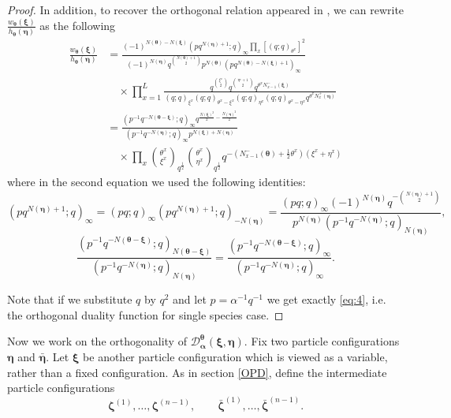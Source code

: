 \documentclass{ximera}
\begin{document}
\begin{proof}
In addition, to recover the orthogonal relation appeared in \cite{CFG21}, we can rewrite $\frac{w_{\boldsymbol\theta}(\boldsymbol\xi)}{h_{\boldsymbol\theta}(\boldsymbol\eta)}$ as the following
\begin{equation*}
\begin{array}{cl}
   \frac{w_{\boldsymbol\theta}(\boldsymbol\xi)}{h_{\boldsymbol\theta}(\boldsymbol\eta)}  & =\frac{(-1)^{N(\boldsymbol\theta)-N(\boldsymbol\xi)}\left(pq^{N(\boldsymbol\eta)+1};q\right)_\infty\prod_x[(q;q)_{\theta^x}]^{2}}{(-1)^{N(\boldsymbol\eta)}q^{\binom{N(\boldsymbol\theta)+1}{2}}p^{N(\boldsymbol\theta)}\left(pq^{N(\boldsymbol\theta) -N(\boldsymbol\xi)+1}\right)_\infty } \\ & \quad\times
   \displaystyle\prod_{x=1}^L\frac{q^{\binom{\xi^x}{2}}q^{\binom{\eta^x+1}{2}}q^{\theta^x N_{x-1}^-(\boldsymbol\xi)}}{(q;q)_{\xi^x}(q;q)_{\theta^x-\xi^x}(q;q)_{\eta^x}(q;q)_{\theta^x-\eta^x}q^{\theta^x N_{x}^+(\boldsymbol\eta)}}\\ 
     &  =\frac{(p^{-1}q^{-N(\boldsymbol\theta-\boldsymbol\xi)};q)_\infty q^{\frac{N(\boldsymbol\xi)^2}{2}-\frac{N(\boldsymbol\eta)^2}{2}}}{(p^{-1}q^{-N(\boldsymbol\eta)};q)_\infty p^{N(\boldsymbol\xi)+N(\boldsymbol\eta)}}
     \\ & \quad\times\displaystyle{\prod_{x}}\binom{\theta^x}{\xi^x}_{q^{\frac{1}{2}}}\binom{\theta^x}{\eta^x}_{q^{\frac{1}{2}}}q^{-\left(N_{x-1}^-(\boldsymbol\theta)+\frac{1}{2}\theta^x\right)(\xi^x+\eta^x)} 
\end{array}
 \end{equation*}
where in the second equation we used the following identities:
\begin{equation*}
    \left(pq^{N(\boldsymbol\eta)+1};q\right)_\infty=(pq;q)_{\infty}(pq^{N(\boldsymbol\eta)+1};q)_{-N(\boldsymbol{\eta})}=
    \frac{ (pq;q)_{\infty} (-1)^{N(\boldsymbol\eta)}q^{-\binom{N(\boldsymbol\eta)+1}{2}}}{p^{N(\boldsymbol\eta)}(p^{-1}q^{-N(\boldsymbol\eta)};q)_{N(\boldsymbol\eta)}},
\end{equation*}
\begin{equation*}
    \frac{(p^{-1}q^{-N(\boldsymbol\theta-\boldsymbol\xi)};q)_{N(\boldsymbol\theta-\boldsymbol\xi)}}{(p^{-1}q^{-N(\boldsymbol\eta)};q)_{N(\boldsymbol\eta)}}= \frac{(p^{-1}q^{-N(\boldsymbol\theta-\boldsymbol\xi)};q)_{\infty}}{(p^{-1}q^{-N(\boldsymbol\eta)};q)_\infty}.
\end{equation*}



Note that if we substitute  $q$ by $q^2$ and let $p=\alpha^{-1}q^{-1}$ we get exactly \eqref{eq:4}, i.e. the orthogonal duality function for single species case.


\end{proof}
Now we work on the orthogonality of $\mathcal{D}^{\boldsymbol\theta}_{\boldsymbol{\alpha}}(\boldsymbol\xi, \boldsymbol\eta)$. Fix two particle configurations $\boldsymbol\eta$ and $\bar{\boldsymbol\eta}$. Let $\boldsymbol\xi$ be another particle configuration which is viewed as a variable, rather than a fixed configuration. As in section \ref{OPD}, define the intermediate particle configurations
$$
\boldsymbol\zeta^{(1)}, \ldots, \boldsymbol\zeta^{(n-1)}, \quad \quad \bar{\boldsymbol\zeta}^{(1)}, \ldots, \bar{\boldsymbol\zeta}^{(n-1)}.
$$
\end{document}

